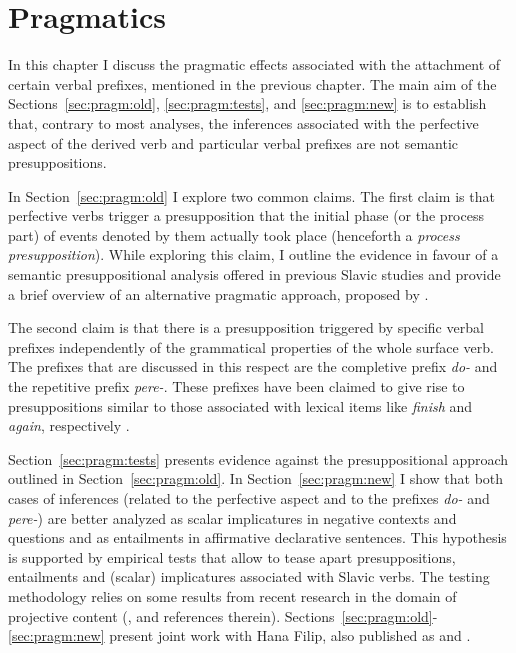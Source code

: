 \chapter{Pragmatics} %
\label{Chapter6}
In this chapter I discuss the pragmatic effects associated with the attachment of certain verbal prefixes, mentioned in the previous chapter. The main aim of the Sections~\ref{sec:pragm:old}, \ref{sec:pragm:tests}, and \ref{sec:pragm:new} is to establish that, contrary to most analyses, the inferences associated with the perfective aspect of the derived verb and particular verbal prefixes are not semantic presuppositions. 

In Section~\ref{sec:pragm:old} I explore two common claims. The first claim is that perfective verbs trigger a presupposition that the initial phase (or the process part) of events denoted by them actually took place (henceforth a \textit{process presupposition}). While exploring this claim, I outline the evidence in favour of a semantic presuppositional analysis offered in previous Slavic studies and provide a brief overview of an alternative pragmatic approach, proposed by \citet{Gronn:04, Gronn:06}.

The second claim is that there is a presupposition triggered by specific verbal prefixes independently of the grammatical properties of the whole surface verb. The prefixes that are discussed in this respect are the completive prefix \textit{do-} and the repetitive prefix \textit{pere-}. These prefixes have been claimed to give rise to presuppositions similar to those associated with lexical items like \textit{finish} and \textit{again}, respectively \citep[see][and Sections~\ref{subsection:semantics:do} and \ref{subsection:semantics:pere} here]{Kagan:book}.

Section~\ref{sec:pragm:tests} presents evidence against the presuppositional approach outlined in Section~\ref{sec:pragm:old}. In Section~\ref{sec:pragm:new}  I show that both cases of inferences (related to the perfective aspect and to the prefixes \textit{do-} and \textit{pere-}) are better analyzed as scalar implicatures in negative contexts and questions and as entailments in affirmative declarative sentences. This hypothesis is supported by empirical tests that allow to tease apart presuppositions, entailments and (scalar) implicatures associated with Slavic verbs. The testing methodology relies on some results from recent research in the domain of projective content (\citealp{Schlenker:08, Chemla:09, Romoli:11}, and references therein). Sections~\ref{sec:pragm:old}-\ref{sec:pragm:new} present joint work with Hana Filip, also published as \citealt{ZinovaFilip:SALT} and \citealt{ZinovaFilip:14}. %

